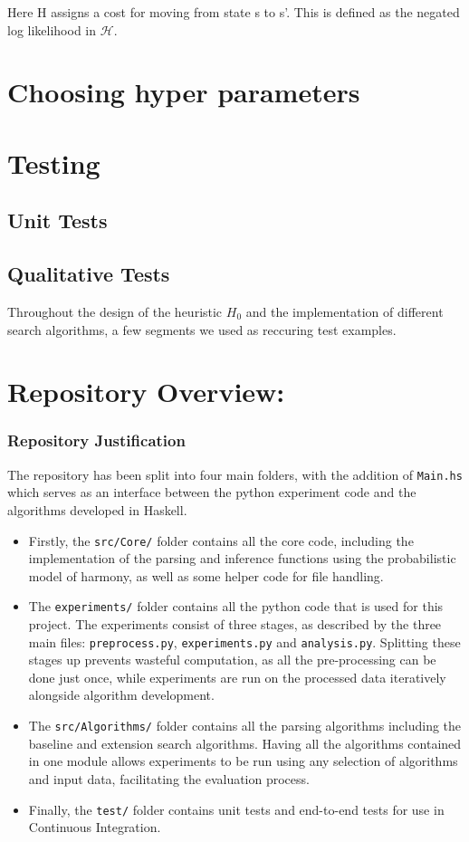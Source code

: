 \documentclass[12pt,a4paper,twoside,openright]{report} \usepackage[pdfborder={0 0 0}]{hyperref}    %
\theoremstyle{definition} \newtheorem{definition}{Definition}[section]
\begin{document}
Here H assigns a cost for moving from state s to s'. This is defined as the negated log likelihood in $\mathcal{H}$.

\section{Choosing hyper parameters}


\section{Testing}

\subsection{Unit Tests}

\subsection{Qualitative Tests} Throughout the design of the heuristic $H_0$ and the implementation of different search
algorithms, a few segments we used as reccuring test examples.

\section{Repository Overview:}

\subsubsection{Repository Justification}

The repository has been split into four main folders, with the addition of \texttt{Main.hs} which serves as an interface
between the python experiment code and the algorithms developed in Haskell. \begin{itemize} \item Firstly, the
  \texttt{src/Core/} folder contains all the core code, including the implementation of the parsing  and inference
  functions using the probabilistic model of harmony, as well as some helper code for file handling. \item The
  \texttt{experiments/} folder contains all the python code that is used for this project. The experiments consist of
  three stages, as described by the three main files: \texttt{preprocess.py}, \texttt{experiments.py} and
  \texttt{analysis.py}. Splitting these stages up prevents wasteful computation, as all the pre-processing can be done
  just once, while experiments are run on the processed data iteratively alongside algorithm development. \item The
  \texttt{src/Algorithms/} folder contains all the parsing algorithms including the baseline and extension search
  algorithms. Having all the algorithms contained in one module allows experiments to be run using any selection of
  algorithms and input data, facilitating the evaluation process.  \item Finally, the \texttt{test/} folder contains
unit tests and end-to-end tests for use in Continuous Integration. \end{itemize}
\end{document}
